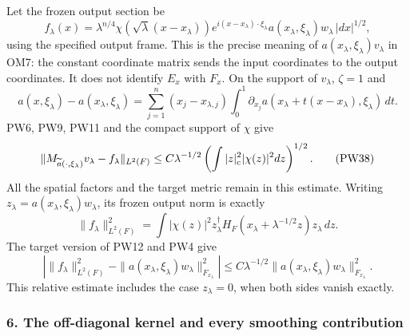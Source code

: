\documentclass[
  11pt,
]{article}
\makeatletter
\let\ReaderOriginalAnchorStart\hyper@anchorstart
\let\ReaderOriginalAnchorEnd\hyper@anchorend
\let\ReaderPendingAliases\@empty
\def\ReaderArmAliases#1{\gdef\ReaderPendingAliases{#1}}
\def\hyper@anchorstart#1{\ReaderIfNativeAnchorTF{#1}{\ReaderPendingAliases\global\let\ReaderPendingAliases\@empty}{}\ReaderOriginalAnchorStart{#1}}
\makeatother
\begin{document}
Let the frozen output section be \[
 f_\lambda(x)=
 \lambda^{n/4}\chi(\sqrt\lambda(x-x_\lambda))
 e^{i(x-x_\lambda)\cdot\xi_\lambda}
 a(x_\lambda,\xi_\lambda)w_\lambda\,|dx|^{1/2},
 \tag{PW36}
\] using the specified output frame. This is the precise meaning of
\(a(x_\lambda,\xi_\lambda)v_\lambda\) in OM7: the constant coordinate
matrix sends the input coordinates to the output coordinates. It does
not identify \(E_x\) with \(F_x\). On the support of \(v_\lambda\),
\(\zeta=1\) and \[
 a(x,\xi_\lambda)-a(x_\lambda,\xi_\lambda)
 =\sum_{j=1}^n(x_j-x_{\lambda,j})
       \int_0^1\partial_{x_j}a
          (x_\lambda+t(x-x_\lambda),\xi_\lambda)\,dt .
 \tag{PW37}
\] PW6, PW9, PW11 and the compact support of \(\chi\) give \[
 \|M_{\widetilde a(\cdot,\xi_\lambda)}v_\lambda
       -f_\lambda\|_{L^2(F)}
 \leq C\lambda^{-1/2}
           \left(\int |z|_{\rm c}^2|\chi(z)|^2dz\right)^{1/2}.
 \tag{PW38}
\] All the spatial factors and the target metric remain in this
estimate. Writing \(z_\lambda=a(x_\lambda,\xi_\lambda)w_\lambda\), its
frozen output norm is exactly \[
 \|f_\lambda\|_{L^2(F)}^2
 =\int|\chi(z)|^2
   z_\lambda^\dagger H_F(x_\lambda+\lambda^{-1/2}z)
                         z_\lambda\,dz .
 \tag{PW39}
\] The target version of PW12 and PW4 give \[
 \left|\|f_\lambda\|_{L^2(F)}^2
    -\|a(x_\lambda,\xi_\lambda)w_\lambda\|_{F_{x_\lambda}}^2\right|
 \leq C\lambda^{-1/2}
        \|a(x_\lambda,\xi_\lambda)w_\lambda\|_{F_{x_\lambda}}^2 .
 \tag{PW40}
\] This relative estimate includes the case \(z_\lambda=0\), when both
sides vanish exactly.

\ReaderArmAliases{\ReaderOriginalAnchorStart{6-the-off-diagonal-kernel-and-every-smoothing-contribution}\ReaderOriginalAnchorEnd\begingroup\expandafter\def\csname @currentHref\endcsname{6-the-off-diagonal-kernel-and-every-smoothing-contribution}\label{6-the-off-diagonal-kernel-and-every-smoothing-contribution}\endgroup}
\subsubsection{6. The off-diagonal kernel and every smoothing
contribution}\label{the-off-diagonal-kernel-and-every-smoothing-contribution}
\end{document}
